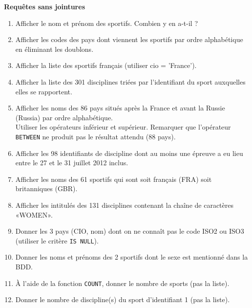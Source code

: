 \begin{exercice}[ : JO]
    \textbf{Requêtes sans jointures}
    \begin{enumerate}
        \item 	Afficher le nom et prénom des sportifs. Combien y en a-t-il ?
        \item 	Afficher les codes des pays dont viennent les sportifs par ordre alphabétique en éliminant les doublons.
        \item 	Afficher la liste des sportifs français (utiliser cio = 'France').
        \item 	Afficher la liste des 301 disciplines triées par l'identifiant du sport auxquelles elles se rapportent.
        \item 	Afficher les noms des 86 pays situés après la France et avant la Russie (Russia) par ordre alphabétique.\\
              Utiliser les opérateurs inférieur et supérieur. Remarquer que l'opérateur \texttt{BETWEEN} ne produit pas le résultat attendu (88 pays).
        \item 	Afficher les 98 identifiants de discipline dont au moins une épreuve a eu lieu entre le 27 et le 31 juillet 2012 inclus.
        \item 	Afficher les noms des 61 sportifs qui sont soit français (FRA) soit britanniques (GBR).
        \item 	Afficher les intitulés des 131 disciplines contenant la chaîne de caractères «WOMEN».
              
        \item  Donner les 3 pays (CIO, nom) dont on ne connaît pas le code ISO2 ou ISO3 (utiliser le critère \texttt{IS NULL}).
        \item 	Donner les noms et prénoms des 2 sportifs dont le sexe est mentionné dans la BDD.
        \item  	À l'aide de la fonction \texttt{COUNT}, donner le nombre de sports (pas la liste).
        \item  Donner le nombre de discipline(s) du sport d'identifiant 1 (pas la liste).
              

\end{enumerate}
\end{exercice}
